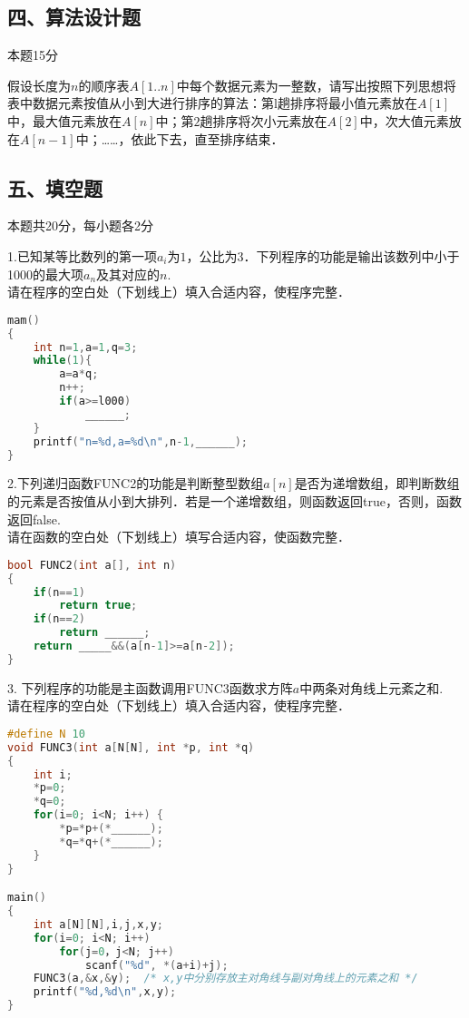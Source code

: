 \subsection{四、算法设计题}

本题15分

  假设长度为$n$的顺序表$A[1..n]$中每个数据元素为一整数，请写出按照下列思想将表中数据元素按值从小到大进行排序的算法：第l趟排序将最小值元素放在$A[1]$中，最大值元素放在$A[n]$中；第$2$趟排序将次小元素放在$A[2]$中，次大值元素放在$A[n-1]$中；……，依此下去，直至排序结束．


\subsection{五、填空题}

本题共20分，每小题各2分

1.已知某等比数列的第一项$a_i$为$1$，公比为$3$．下列程序的功能是输出该数列中小于1000的最大项$a_n$及其对应的$n$. \\
请在程序的空白处（下划线上）填入合适内容，使程序完整．
\begin{lstlisting}[language=cpp]
mam()
{
    int n=1,a=1,q=3;
    while(1){
        a=a*q;
        n++;
        if(a>=l000)
            ______;
    }
    printf("n=%d,a=%d\n",n-1,______);
}
\end{lstlisting}

2.下列递归函数FUNC2的功能是判断整型数组$a[n]$是否为递增数组，即判断数组的元素是否按值从小到大排列．若是一个递增数组，则函数返回true，否则，函数返回false. \\
请在函数的空白处（下划线上）填写合适内容，使函数完整．
\begin{lstlisting}[language=cpp]
bool FUNC2(int a[], int n)
{
    if(n==1)
        return true;
    if(n==2)
        return ______;
    return _____&&(a[n-1]>=a[n-2]);
}


\end{lstlisting}

3. 下列程序的功能是主函数调用FUNC3函数求方阵$a$中两条对角线上元紊之和. \\
请在程序的空白处（下划线上）填入合适内容，使程序完整．
\begin{lstlisting}[language=cpp]
#define N 10
void FUNC3(int a[N[N], int *p, int *q)
{
    int i;
    *p=0;
    *q=0;
    for(i=0; i<N; i++) {
        *p=*p+(*______);
        *q=*q+(*______);
    }
}

main()
{
    int a[N][N],i,j,x,y;
    for(i=0; i<N; i++)
        for(j=0，j<N; j++)
            scanf("%d", *(a+i)+j);
    FUNC3(a,&x,&y);  /* x,y中分别存放主对角线与副对角线上的元素之和 */
    printf("%d,%d\n",x,y);
}
\end{lstlisting}